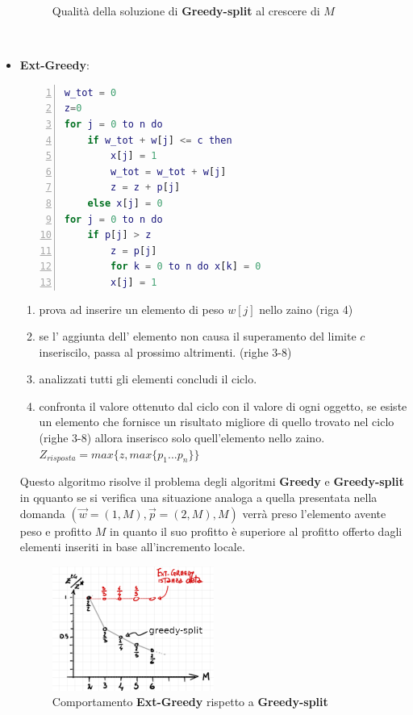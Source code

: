 \documentclass[a4paper]{article}
\begin{document}
\begin{itemize}
\begin{figure}[!ht]
\caption{Qualità della soluzione di \textbf{Greedy-split} al crescere di $M$} \label{FIG:C_9_greedy}
\end{figure}\\
\item \textbf{Ext-Greedy}:
		\begin{lstlisting}[numbers=left,firstnumber=1,language=Matlab, stepnumber=1, xleftmargin=50pt]
w_tot = 0
z=0
for j = 0 to n do
	if w_tot + w[j] <= c then
		x[j] = 1
		w_tot = w_tot + w[j]
		z = z + p[j]
	else x[j] = 0
for j = 0 to n do
	if p[j] > z
		z = p[j]
		for k = 0 to n do x[k] = 0
		x[j] = 1
		\end{lstlisting}
		\begin{enumerate}
			\item prova ad inserire un elemento di peso $w[j]$ nello zaino (riga 4)
			\item se l' aggiunta dell' elemento non causa il superamento del limite $c$ inseriscilo, passa al prossimo altrimenti. (righe 3-8)
			\item analizzati tutti gli elementi concludi il ciclo.
			\item confronta il valore ottenuto dal ciclo con il valore di ogni oggetto, se esiste un elemento che fornisce un risultato migliore di quello trovato nel ciclo (righe 3-8) allora inserisco solo quell'elemento nello zaino. $Z_{risposta} = max\{z, max\{p_1 ... p_n\}\}$
		\end{enumerate}
		Questo algoritmo risolve il problema degli algoritmi \textbf{Greedy} e \textbf{Greedy-split} in qquanto se si verifica una situazione analoga a quella presentata nella domanda $(\vec w = (1,M), \vec p = (2,M), M)$ verrà preso l'elemento avente peso e profitto $M$ in quanto il suo profitto è superiore al profitto offerto dagli elementi inseriti in base all'incremento locale.
\begin{figure}[!ht]
\centering
\includegraphics[width=0.5\textwidth]{./img/C_9_ext.png}
\caption{Comportamento \textbf{Ext-Greedy} rispetto a \textbf{Greedy-split}} \label{FIG:C_9_ext}
\end{figure}\\
\end{itemize}
\end{document}
